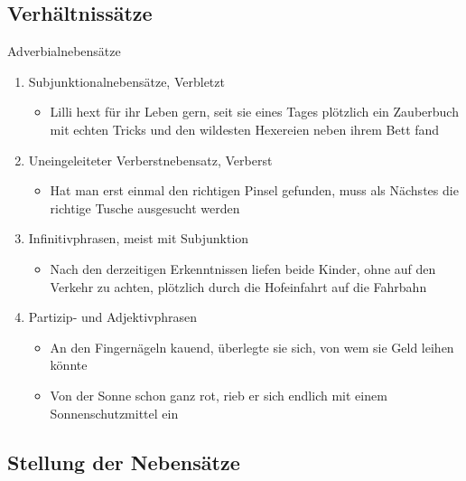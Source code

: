 \documentclass[UTF8]{report}
\begin{document}
\subsection{Verhältnissätze}
Adverbialnebensätze
\begin{enumerate}
    \item Subjunktionalnebensätze, Verbletzt
    \begin{itemize}
        \item Lilli hext für ihr Leben gern, seit sie eines Tages plötzlich ein Zauberbuch mit echten
        Tricks und den wildesten Hexereien neben ihrem Bett fand
    \end{itemize}
    \item Uneingeleiteter Verberstnebensatz, Verberst
    \begin{itemize}
        \item Hat man erst einmal den richtigen Pinsel gefunden, muss als Nächstes
        die richtige Tusche ausgesucht werden
    \end{itemize}
    \item Infinitivphrasen, meist mit Subjunktion
    \begin{itemize}
        \item Nach den derzeitigen Erkenntnissen liefen beide Kinder, 
        ohne auf den Verkehr zu achten, plötzlich durch die Hofeinfahrt auf die Fahrbahn
    \end{itemize}
    \item Partizip- und Adjektivphrasen
    \begin{itemize}
        \item An den Fingernägeln kauend, überlegte sie sich, von wem sie Geld leihen könnte
        \item Von der Sonne schon ganz rot, rieb er sich endlich mit einem Sonnenschutzmittel ein
    \end{itemize}
\end{enumerate}

\subsection{Stellung der Nebensätze }
\end{document}
